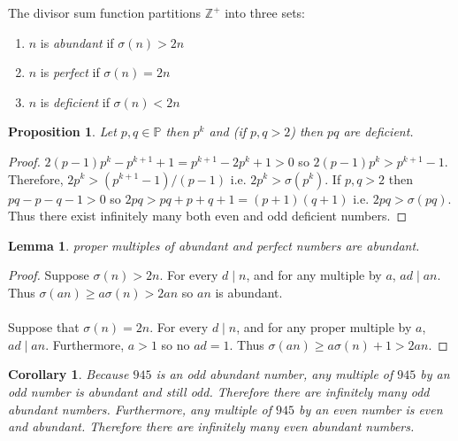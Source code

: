 \documentclass[12pt]{extarticle}
\renewcommand\qedsymbol{$\square$}
\newcommand{\divides}{\mid}
\newcommand{\Zplus}{\mathbb{Z}^{+}}
\newcommand{\Primes}{\mathbb{P}}
\newtheorem{lemma}[theorem]{Lemma}
\newtheorem{proposition}[theorem]{Proposition}
\newtheorem{corollary}[theorem]{Corollary}
\newenvironment{definition}[1][Definition:]{\begin{trivlist}
\item[\hskip \labelsep {\bfseries #1}]}{\end{trivlist}}
\newenvironment{lproof}{\begin{proof} \renewcommand{\qedsymbol}{}}{\end{proof}}
\begin{document}
\begin{definition}
The divisor sum function partitions $\Zplus$ into three sets:
\begin{enumerate}
\item $n$ is \textit{abundant} if $\sigma (n) > 2n$
\item $n$ is \textit{perfect} if $\sigma (n) = 2n$
\item $n$ is \textit{deficient} if $\sigma (n) < 2n$
\end{enumerate}
\end{definition}

\begin{proposition}
Let $p, q \in \Primes$ then $p^k$ and (if $p,q > 2$) then $pq$ are deficient.  
\end{proposition}

\begin{lproof}
$2(p-1)p^k - p^{k+1} + 1 = p^{k+1} - 2p^k + 1 > 0$ so $2(p-1)p^k > p^{k+1} - 1$.\\ Therefore, $2p^k > (p^{k+1} - 1)/(p-1)$ i.e. $2p^k > \sigma (p^k)$. If $p,q > 2$ then \\ $pq - p - q - 1 > 0$ so $2pq > pq + p + q + 1 = (p+1) (q+1)$ i.e. $2pq > \sigma (pq)$.\\
Thus there exist infinitely many both even and odd deficient numbers.
\end{lproof}

\begin{lemma}
\label{abundantmultiples}
proper multiples of abundant and perfect numbers are abundant. \end{lemma}

\begin{lproof}
Suppose $\sigma (n) > 2n$. For every $d \divides n$, and for any multiple by $a$, $ad \divides an$.\\ Thus $\sigma (an) \ge a \sigma (n) > 2an$ so $an$ is abundant. \\\\
Suppose that $\sigma (n) = 2n$. For every $d \divides n$, and for any proper multiple by $a$, $ad \divides an$. Furthermore, $a > 1$ so no $ad = 1$. Thus $\sigma (an) \ge a \sigma (n) + 1 > 2an$.
\end{lproof}

\begin{corollary}
Because $945$ is an odd abundant number, any multiple of $945$ by an odd number is abundant and still odd. Therefore there are infinitely many odd abundant numbers. Furthermore, any multiple of $945$ by an even number is even and abundant. Therefore there are infinitely many even abundant numbers.
\end{corollary}
\end{document}
